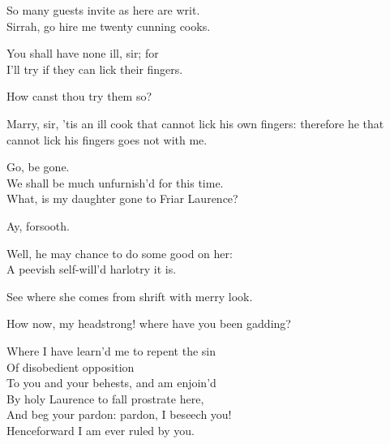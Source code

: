  
\begin{speech}
So many guests invite as here are writ.  \\
Sirrah, go hire me twenty cunning cooks. \\
\end{speech}
\begin{speech}
You shall have none ill, sir; for \\
I'll try if they can lick their fingers. \\
\end{speech}
\begin{speech}
How canst thou try them so?
\end{speech}
\begin{speech}
Marry, sir, 'tis an ill cook that
cannot lick his own fingers: therefore he that
cannot lick his fingers goes not with me.
\end{speech}
\begin{speech}
Go, be gone.  \\
We shall be much unfurnish'd for this time. \\
What, is my daughter gone to Friar Laurence? \\
\end{speech}
\begin{speech}
Ay, forsooth. \\
\end{speech}
\begin{speech}
Well, he may chance to do some good on her: \\
A peevish self-will'd harlotry it is. \\
\end{speech}
\begin{speech}
See where she comes from shrift with merry look.
 \\
\end{speech}
\begin{speech}
How now, my headstrong! where have you been gadding?
\\
\end{speech}
\begin{speech}
Where I have learn'd me to repent the sin \\
Of disobedient opposition \\
To you and your behests, and am enjoin'd \\
By holy Laurence to fall prostrate here, \\
And beg your pardon: pardon, I beseech you! \\
Henceforward I am ever ruled by you. \\
\end{speech}
